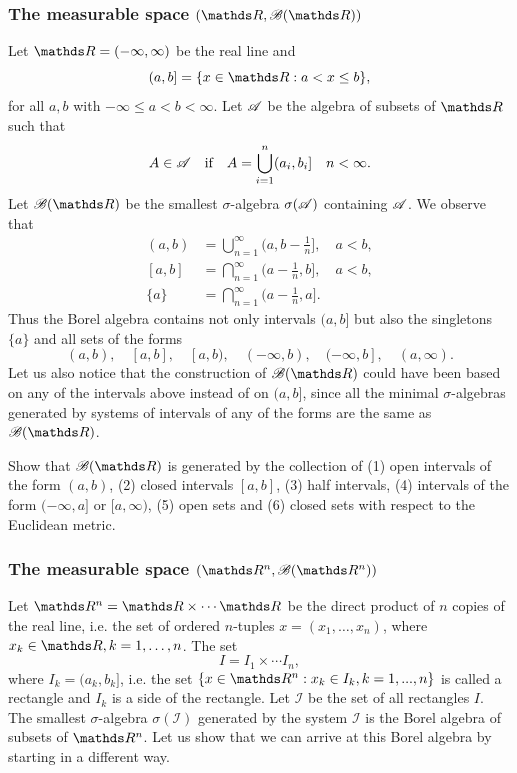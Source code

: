 \subsubsection{The measurable space $(\R, \B(\R))$}
Let $\R = (-\infty, \infty)$ be the real line and
\begin{equation*}
    (a,b] = \{ x \in \R : a < x \le b \},
\end{equation*}
for all $a,b$ with $-\infty \le a < b < \infty$. Let $\mathcal{A}$ be the algebra of subsets of $\R$ such that
\begin{equation*}
    A \in \mathcal{A} \quad \text{if} \quad  A = \bigcup_{i=1}^n (a_i, b_i] \quad n <\infty.
\end{equation*}
Let $\B(\R)$ be the smallest $\sigma$-algebra $\sigma(\mathcal{A})$ containing $\mathcal{A}$. We observe that 
\begin{align*}
    (a,b) &= \bigcup_{n=1}^\infty \bigg(a,b-\frac{1}{n} \bigg], \quad a<b,\\
    [a,b] &= \bigcap_{n=1}^\infty \bigg(a - \frac{1}{n},b\bigg], \quad a<b,\\
    \{a\} &= \bigcap_{n=1}^\infty \bigg(a - \frac{1}{n},a\bigg].
\end{align*}
Thus the Borel algebra contains not only intervals $(a,b]$ but also the singletons $\{ a\}$ and all sets of the forms 
\begin{equation*}
    (a,b), \quad [a,b], \quad [a,b), \quad (-\infty,b), \quad (-\infty,b], \quad (a,\infty).
\end{equation*}
Let us also notice that the construction of $\B(\R)$ could have been based on any of the intervals above instead of on $(a, b]$, since all the minimal $\sigma$-algebras generated by systems of intervals of any of the forms are the same as $\B(\R)$.

\begin{exercise}
Show that $\B(\R)$ is generated by the collection of (1) open intervals of the form $(a,b)$, (2) closed intervals $[a,b]$, (3) half intervals, (4) intervals of the form $(-\infty, a]$ or $[a,\infty)$, (5) open sets and (6) closed sets with respect to the Euclidean metric.
\end{exercise}

\subsubsection{The measurable space $(\R^n, \B(\R^n))$}
Let $\R^n = \R \times \cdots \R$ be the direct product of $n$ copies of the real line, i.e. the set of ordered $n$-tuples $x = (x_1,\dots,x_n)$, where $x_k \in \R, k = 1,\dots, n$. The set
\begin{equation*}
    I = I_1 \times \cdots I_n,
\end{equation*}
where $I_k = (a_k,b_k]$, i.e. the set $\{x\in \R^n: x_k \in I_k, k=1,...,n \}$ is called a rectangle and $I_k$ is a side of the rectangle. Let $\mathcal{I}$ be the set of all rectangles $I$. The smallest $\sigma$-algebra $\sigma(\mathcal{I})$ generated by the system $\mathcal{I}$ is the Borel algebra of subsets of $\R^n$. Let us show that we can arrive at this Borel algebra by starting in a different way.
\newline

